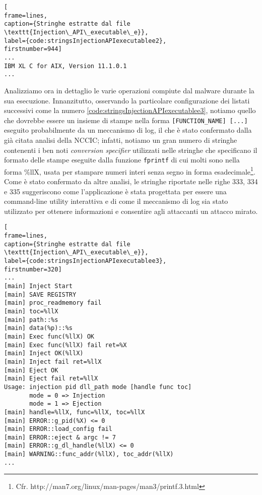 \documentclass[10pt,a4paper, titlepage]{report}
\begin{document}
\begin{lstlisting}[
frame=lines, 
caption={Stringhe estratte dal file \texttt{Injection\_API\_executable\_e}}, 
label={code:stringsInjectionAPIexecutablee2},
firstnumber=944]
...
IBM XL C for AIX, Version 11.1.0.1
...
\end{lstlisting}

Analizziamo ora in dettaglio le varie operazioni compiute dal malware durante la sua esecuzione.
Innanzitutto, osservando la particolare configurazione dei listati successivi come la numero \ref{code:stringsInjectionAPIexecutablee3}, notiamo quello che dovrebbe essere un insieme di stampe nella forma \texttt{[FUNCTION_NAME] [...]} eseguito probabilmente da un meccanismo di log, il che è stato confermato dalla già citata analisi della NCCIC; infatti, notiamo un gran numero di stringhe contenenti i ben noti \textit{conversion specifier} utilizzati nelle stringhe che specificano il formato delle stampe eseguite dalla funzione \texttt{fprintf} di cui molti sono nella forma \%llX, usata per stampare numeri interi senza segno in forma esadecimale\footnote{Cfr. http://man7.org/linux/man-pages/man3/printf.3.html}. 
Come è stato confermato da altre analisi, le stringhe riportate nelle righe 333, 334 e 335 suggeriscono come l'applicazione è stata progettata per essere una command-line utility interattiva e di come il meccanismo di log sia stato utilizzato per ottenere informazioni e consentire agli attaccanti un attacco mirato.

\begin{lstlisting}[
frame=lines, 
caption={Stringhe estratte dal file \texttt{Injection\_API\_executable\_e}}, 
label={code:stringsInjectionAPIexecutablee3},
firstnumber=320]
...
[main] Inject Start
[main] SAVE REGISTRY
[main] proc_readmemory fail
[main] toc=%llX
[main] path::%s
[main] data(%p)::%s
[main] Exec func(%llX) OK
[main] Exec func(%llX) fail ret=%X
[main] Inject OK(%llX)
[main] Inject fail ret=%llX
[main] Eject OK
[main] Eject fail ret=%llX
Usage: injection pid dll_path mode [handle func toc]
       mode = 0 => Injection
       mode = 1 => Ejection
[main] handle=%llX, func=%llX, toc=%llX
[main] ERROR::g_pid(%X) <= 0
[main] ERROR::load_config fail
[main] ERROR::eject & argc != 7
[main] ERROR::g_dl_handle(%llX) <= 0
[main] WARNING::func_addr(%llX), toc_addr(%llX)
...
\end{lstlisting}
\end{document}
